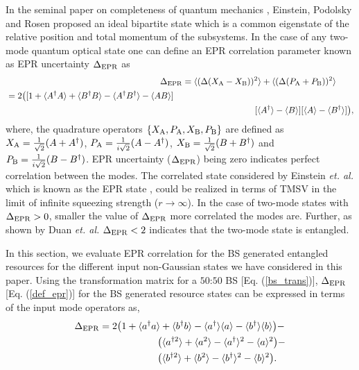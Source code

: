 \documentclass[letter,scriptaddress,twocolumn, prl,showkeys]{revtex4}
\begin{document}
In the seminal paper on completeness of quantum mechanics \cite{EPR}, Einstein, Podolsky and Rosen proposed an ideal bipartite state which is a common eigenstate of the relative position and total momentum of the subsystems.
In the case of any two-mode quantum optical state one can define an EPR correlation parameter known as EPR uncertainty $\Delta_{\rm{EPR}}$ \cite{epr_corr} as 
\begin{align}
\Delta_{\rm{EPR}}&=\langle(\Delta(X_{\rm{A}}-X_{\rm{B}}))^{2}\rangle+\langle(\Delta(P_{\rm{A}}+P_{\rm{B}}))^{2}\rangle \nonumber \\
\begin{split}
&=2\big([1+\langle A^{\dagger}A\rangle+\langle B^{\dagger}B\rangle-\langle A^{\dagger}B^{\dagger}\rangle-\langle AB\rangle] \nonumber
\end{split}\\
&~~~~~~~~~~~~~~~~~~~~~~~~~[\langle A^{\dagger}\rangle-\langle B\rangle][\langle A\rangle-\langle B^{\dagger}\rangle]\big), \label{def_epr}
\end{align}
where, the quadrature operators $\lbrace X_{\rm{A}},P_{\rm{A}},X_{\rm{B}},P_{\rm{B}}\rbrace$ are defined as $X_{\rm{A}}=\frac{1}{\sqrt{2}}(A+A^{\dagger})$, $P_{\rm{A}}=\frac{1}{i\sqrt{2}}(A-A^{\dagger})$, $X_{\rm{B}}=\frac{1}{\sqrt{2}}(B+B^{\dagger})$ and $P_{\rm{B}}=\frac{1}{i\sqrt{2}}(B-B^{\dagger})$.
EPR uncertainty ($\Delta_{\rm{EPR}}$) being zero indicates perfect correlation between the modes.
The correlated state considered by Einstein \emph{et. al.} which is known as the EPR state \cite{epr_st}, could be realized in terms of TMSV in the limit of infinite squeezing strength ($r\rightarrow \infty$).
In the case of two-mode states with $\Delta_{\rm{EPR}}>0$, smaller the value of $\Delta_{\rm{EPR}}$ more correlated the modes are.
Further, as shown by Duan \emph{et. al.} \cite{epr_corr} $\Delta_{\rm{EPR}}<2$ indicates that the two-mode state is entangled.

In this section, we evaluate EPR correlation for the BS generated entangled resources for the different input non-Gaussian states we have considered in this paper. 
Using the transformation matrix for a $50$:$50$ BS [Eq. (\ref{bs_trans})], $\Delta_{\rm{EPR}}$ [Eq. (\ref{def_epr})] for the BS generated resource states can be expressed in terms of the input mode operators as,
\begin{align}
\Delta_{\rm{EPR}}&= 2\big( 1+\langle a^{\dagger}a\rangle + \langle b^{\dagger}b\rangle - \langle a^{\dagger}\rangle\langle a\rangle - \langle b^{\dagger}\rangle\langle b\rangle \big) - \nonumber \\
&~~~~~~~~~~~~~~~~~~ \big( \langle a^{\dagger 2}\rangle + \langle a^{2}\rangle -\langle a^{\dagger}\rangle^{2} - \langle a\rangle^{2} \big) - \nonumber \\
&~~~~~~~~~~~~~~~~~~ \big( \langle b^{\dagger 2}\rangle + \langle b^{2}\rangle -\langle b^{\dagger}\rangle^{2} - \langle b\rangle^{2} \big) . \label{def_epr_bs}
\end{align}
\end{document}
